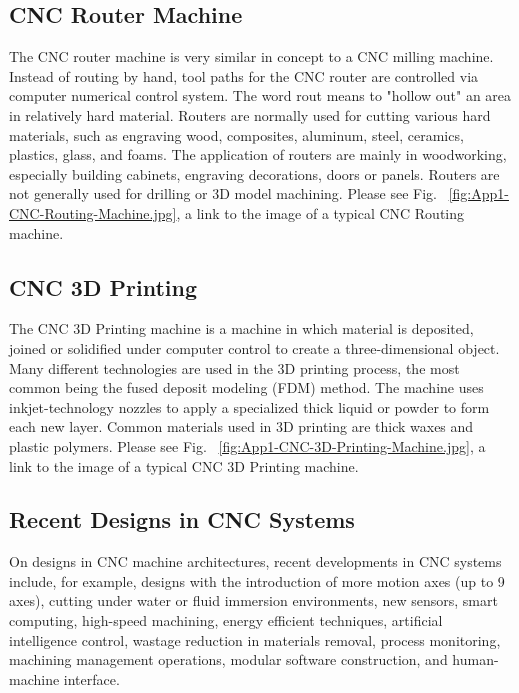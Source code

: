 \subsection{CNC Router Machine}

The CNC router machine is very similar in concept to a CNC milling machine. Instead of routing by hand, tool paths for the CNC router are controlled via computer numerical control system. The word rout means to "hollow out" an area in relatively hard material. Routers are normally used for cutting various hard materials, such as engraving wood, composites, aluminum, steel, ceramics, plastics, glass, and foams. The application of routers are mainly in woodworking, especially building cabinets,  engraving decorations, doors or panels. Routers are not generally used for drilling or 3D model machining. Please see Fig. ~\ref{fig:App1-CNC-Routing-Machine.jpg}, a link to the image of a typical CNC Routing machine.

\subsection{CNC 3D Printing}

The CNC 3D Printing machine is a machine in which material is deposited, joined or solidified under computer control to create a three-dimensional object. Many different technologies are used in the 3D printing process, the most common being the fused deposit modeling (FDM) method. The machine uses inkjet-technology nozzles to apply a specialized thick liquid or powder to form each new layer. Common materials used in 3D printing are thick waxes and plastic polymers. 
Please see Fig. ~\ref{fig:App1-CNC-3D-Printing-Machine.jpg}, a link to the image of a typical CNC 3D Printing machine.

\subsection{Recent Designs in CNC Systems}

On designs in CNC machine architectures, recent developments in CNC systems include, for example, designs with the introduction of more motion axes (up to 9 axes), cutting under water or fluid immersion environments, new sensors, smart computing, high-speed machining, energy efficient techniques, artificial intelligence control, wastage reduction in materials removal, process monitoring, machining management operations, modular software construction, and human-machine interface. 
\vspace*{1\baselineskip}

